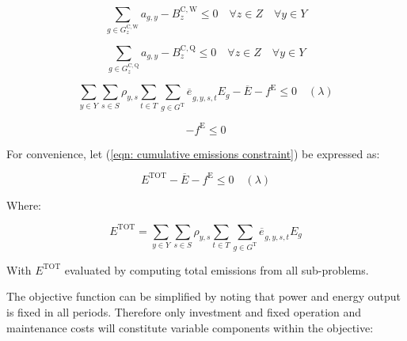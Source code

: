 \documentclass{article}
\newcommand{\sGeneratorsCandidateWind}{G^{\mathrm{C,W}}}
\newcommand{\sGeneratorsThermal}{G^{\mathrm{T}}}
\newcommand{\sStorageCandidate}{G^{\mathrm{C,Q}}}
\newcommand{\sYears}{Y}
\newcommand{\sScenarios}{S}
\newcommand{\sIntervals}{T}
\newcommand{\sZones}{Z}
\newcommand{\iGenerator}{g}
\newcommand{\iYear}{y}
\newcommand{\iScenario}{s}
\newcommand{\iInterval}{t}
\newcommand{\iZone}{z}
\newcommand{\cScenarioDuration}[1][\iYear,\iScenario]{\rho_{#1}}
\newcommand{\cEmissionsIntensity}[1][\iGenerator]{E_{#1}}
\newcommand{\cBuildLimit}[1][]{B^{\mathrm{C,#1}}_{\iZone}}
\newcommand{\cEmmissionsCumulativeTarget}{\overline{E}}
\newcommand{\cEmissionsTotal}{E^{\mathrm{TOT}}}
\newcommand{\vEnergy}[1][\iGenerator,\iYear,\iScenario,\iInterval]{e_{#1}}
\newcommand{\vEmissionsTargetViolation}{f^{\mathrm{E}}}
\newcommand{\vInstalledCapacityTotal}[1][\iGenerator,\iYear]{a_{#1}}
\begin{document}
\begin{equation}
\sum\limits_{\iGenerator \in \sGeneratorsCandidateWind_{\iZone}} \vInstalledCapacityTotal - \cBuildLimit[W] \leq 0 \quad \forall \iZone \in \sZones \quad \forall \iYear \in \sYears 
\end{equation}

\begin{equation}
\sum\limits_{\iGenerator \in \sStorageCandidate_{\iZone}} \vInstalledCapacityTotal - \cBuildLimit[Q] \leq 0  \quad \forall \iZone \in \sZones \quad \forall \iYear \in \sYears
\end{equation}

\begin{equation}
\sum\limits_{\iYear \in \sYears} \sum\limits_{\iScenario \in \sScenarios} \cScenarioDuration \sum\limits_{\iInterval \in \sIntervals} \sum\limits_{\iGenerator \in \sGeneratorsThermal} \overline{\vEnergy[]}_{\iGenerator,\iYear,\iScenario,\iInterval} \cEmissionsIntensity - \cEmmissionsCumulativeTarget - \vEmissionsTargetViolation \leq 0 \quad (\lambda)
	\label{eqn: cumulative emissions constraint}
\end{equation}

\begin{equation}
	- \vEmissionsTargetViolation \leq 0
	\label{eqn: non-negative emissions constraint violation}
\end{equation}

For convenience, let (\ref{eqn: cumulative emissions constraint}) be expressed as:

\begin{equation}
	\cEmissionsTotal - \cEmmissionsCumulativeTarget - \vEmissionsTargetViolation \leq 0 \quad (\lambda)
\end{equation}

Where:

\begin{equation}
	\cEmissionsTotal = \sum\limits_{\iYear \in \sYears} \sum\limits_{\iScenario \in \sScenarios} \cScenarioDuration \sum\limits_{\iInterval \in \sIntervals} \sum\limits_{\iGenerator \in \sGeneratorsThermal} \overline{\vEnergy[]}_{\iGenerator,\iYear,\iScenario,\iInterval} \cEmissionsIntensity
\end{equation}

With $\cEmissionsTotal$ evaluated by computing total emissions from all sub-problems. 

The objective function can be simplified by noting that power and energy output is fixed in all periods. Therefore only investment and fixed operation and maintenance costs will constitute variable components within the objective:
\end{document}

